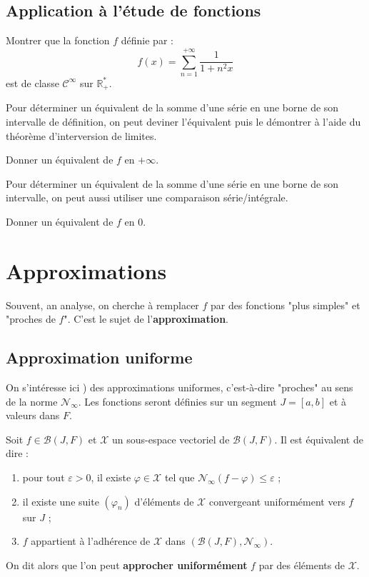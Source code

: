 \documentclass[french]{article}
\newcommand{\R}{\mathbb{R}}
\newcommand{\st}{^*}
\theoremstyle{plain}
\theoremstyle{definition}
\theoremstyle{remark}
\begin{document}
\subsection{Application à l'étude de fonctions}

\begin{exo}
	Montrer que la fonction $f$ définie par :
	$$f(x)=\sum_{n=1}^{+\infty}\frac{1}{1+n^2x}$$ est de classe $\mathcal{C}^\infty$ sur $\R_+\st$.
\end{exo}

\begin{met}
	Pour déterminer un équivalent de la somme d'une série en une borne de son intervalle de définition, on peut deviner l'équivalent puis le démontrer à l'aide du théorème d'interversion de limites.
\end{met}

\begin{exo}
	Donner un équivalent de $f$ en $+\infty$.
\end{exo}

\begin{met}
	Pour déterminer un équivalent de la somme d'une série en une borne de son intervalle, on peut aussi utiliser une comparaison série/intégrale.
\end{met}

\begin{exo}
	Donner un équivalent de $f$ en $0$.
\end{exo}

\section{Approximations}

Souvent, an analyse, on cherche à remplacer $f$ par des fonctions "plus simples" et "proches de $f$". C'est le sujet de l'\textbf{approximation}.

\subsection{Approximation uniforme}

On s'intéresse ici ) des approximations uniformes, c'est-à-dire "proches" au sens de la norme $\mathcal{N}_\infty$. Les fonctions seront définies sur un segment $J=[a,b]$ et à valeurs dans $F$.

\begin{prop}%
	Soit $f\in\mathcal{B}(J,F)$ et $\mathcal{X}$ un sous-espace vectoriel de $\mathcal{B}(J,F)$. Il est équivalent de dire :
	\begin{enumerate}[label=(\roman*)]
		\item pour tout $\varepsilon>0$, il existe $\varphi\in\mathcal{X}$ tel que $\mathcal{N}_\infty(f-\varphi)\leqslant\varepsilon$ ;
		\item il existe une suite $(\varphi_n)$ d'éléments de $\mathcal{X}$ convergeant uniformément vers $f$ sur $J$ ;
		\item $f$ appartient à l'adhérence de $\mathcal{X}$ dans $(\mathcal{B}(J,F),\mathcal{N}_\infty)$.
	\end{enumerate}
	On dit alors que l'on peut \textbf{approcher uniformément} $f$ par des éléments de $\mathcal{X}$.
\end{prop}
\end{document}

